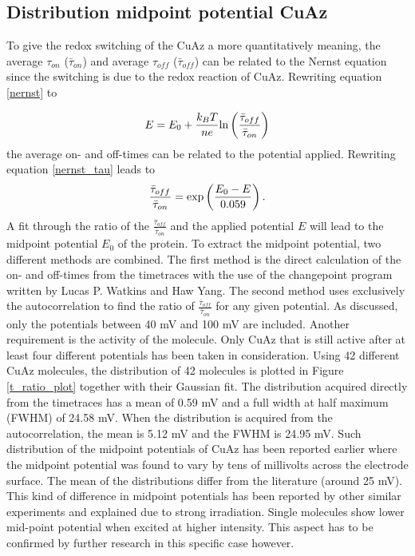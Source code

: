 \documentclass[twoside,single]{lion-msc}
\begin{document}
\subsection{Distribution midpoint potential CuAz}
To give the redox switching of the CuAz a more quantitatively meaning, the average $\tau_{on}$ ($\bar{\tau}_{on}$) and average $\tau_{off}$ ($\bar{\tau}_{off}$) can be related to the Nernst equation since the switching is due to the redox reaction of CuAz. Rewriting equation \ref{nernst} to 

\begin{equation}\label{nernst_tau}
E = E_{0}+\frac{k_{B}T}{ne}\textup{ln}\left ( \frac{\bar{\tau}_{off}}{\bar{\tau}_{on}} \right )
\end{equation}
the average on- and off-times can be related to the potential applied. Rewriting equation \ref{nernst_tau} leads to
\begin{equation}\label{fit_onoff}
\frac{\bar{\tau}_{off}}{\bar{\tau}_{on}} = \textup{exp}\left ( \frac{E_{0}-E}{0.059} \right ).
\end{equation}
A fit through the ratio of the $\frac{\bar{\tau}_{off}}{\bar{\tau}_{on}}$ and the applied potential $E$ will lead to the midpoint potential $E_{0}$ of the protein. To extract the midpoint potential, two different methods are combined. The first method is the direct calculation of the on- and off-times from the timetraces with the use of the changepoint program written by  Lucas P. Watkins and Haw Yang. The second method uses exclusively the autocorrelation to find the ratio of  $\frac{\bar{\tau}_{off}}{\bar{\tau}_{on}}$ for any given potential. As discussed, only the potentials between 40 mV and 100 mV are included. Another requirement is the activity of the molecule. Only CuAz that is still active after at least four different potentials has been taken in consideration. Using 42 different CuAz molecules, the distribution of 42 molecules is plotted in Figure \ref{t_ratio_plot} together with their Gaussian fit. The distribution acquired directly from the timetraces has a mean of 0.59 mV and a full width at half maximum (FWHM) of 24.58 mV. When the distribution is acquired from the autocorrelation, the mean is 5.12 mV and the FWHM is 24.95 mV. Such distribution of the midpoint potentials of CuAz has been reported earlier \cite{Salverda2010} where the midpoint potential was found to vary by tens of millivolts across the electrode surface. The mean of the distributions differ from the literature (around 25 mV). This kind of difference in midpoint potentials has been reported by other similar experiments \cite{Zhang2017} and explained due to strong irradiation. Single molecules show lower mid-point potential when excited at higher intensity. This aspect has to be confirmed by further research in this specific case however. 
\end{document}
